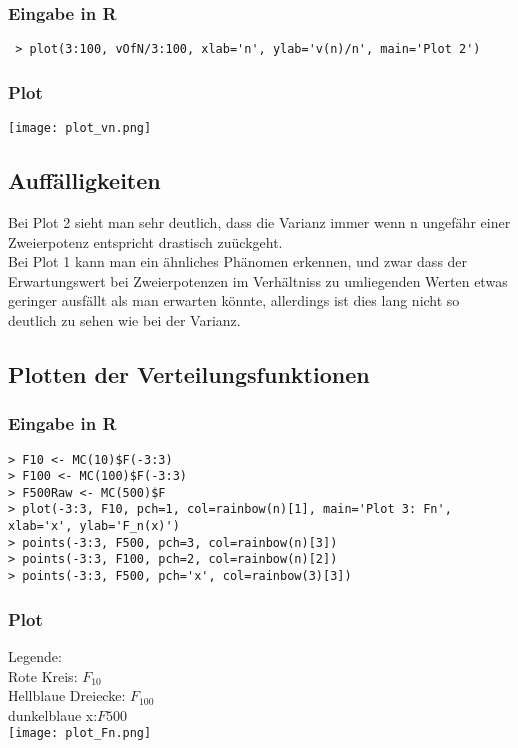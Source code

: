 \documentclass[a4paper, 10pt]{article}
\begin{document}
\subsubsection{Eingabe in R}
\begin{lstlisting}
 > plot(3:100, vOfN/3:100, xlab='n', ylab='v(n)/n', main='Plot 2')
\end{lstlisting}
\subsubsection{Plot}
\texttt{[image: plot\_vn.png]} 
\subsection{Auffälligkeiten}
Bei Plot 2 sieht man sehr deutlich, dass die Varianz immer wenn n ungefähr einer Zweierpotenz entspricht drastisch zuückgeht. \\
Bei Plot 1 kann man ein ähnliches Phänomen erkennen, und zwar dass der Erwartungswert bei Zweierpotenzen im Verhältniss zu umliegenden Werten etwas geringer ausfällt als man erwarten könnte, allerdings ist dies lang nicht so deutlich zu sehen wie bei der Varianz.
\subsection{Plotten der Verteilungsfunktionen}
\subsubsection{Eingabe in R}
\begin{lstlisting}
> F10 <- MC(10)$F(-3:3)
> F100 <- MC(100)$F(-3:3)
> F500Raw <- MC(500)$F
> plot(-3:3, F10, pch=1, col=rainbow(n)[1], main='Plot 3: Fn', xlab='x', ylab='F_n(x)')
> points(-3:3, F500, pch=3, col=rainbow(n)[3])
> points(-3:3, F100, pch=2, col=rainbow(n)[2])
> points(-3:3, F500, pch='x', col=rainbow(3)[3])
\end{lstlisting}
\subsubsection{Plot}
Legende: \\
Rote Kreis: $ F_10$ \\
Hellblaue Dreiecke: $F_100$ \\
dunkelblaue x:$ F500$\\
\texttt{[image: plot\_Fn.png]} 
\end{document}
